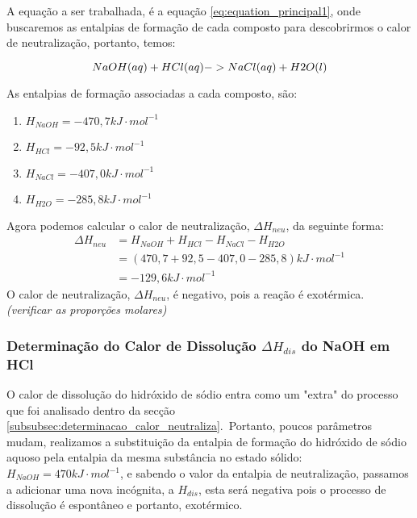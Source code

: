             \indent A equação a ser trabalhada, é a equação \ref{eq:equation_principal1}, onde buscaremos as entalpias de formação de cada composto para descobrirmos o calor de neutralização, portanto, temos:\
                        
            \begin{equation}
            	\notag
            	{NaOH(aq) + HCl(aq) -> NaCl(aq) + H2O(l)}
            \end{equation} 
        
        	\indent As entalpias de formação associadas a cada composto, são:
        	\begin{enumerate}
        		\item $H_{NaOH} = -470,7 kJ \cdot mol^{-1}$
        		\item $H_{HCl} = -92,5 kJ \cdot mol^{-1}$
                \item $H_{NaCl} = - 407,0 kJ \cdot mol^{-1}$
                \item $H_{H2O} = -285,8 kJ \cdot mol^{-1}$
        	\end{enumerate}
            \indent Agora podemos calcular o calor de neutralização, $\Delta{H_{neu}}$, da seguinte forma:
            \begin{equation}
                \begin{split}
                    \Delta{H_{neu}} &= H_{NaOH} + H_{HCl} - H_{NaCl} - H_{H2O} \\
                    &= (470,7 + 92,5 - 407,0 - 285,8 )kJ \cdot mol^{-1} \\
                    &= - 129,6 kJ \cdot mol^{-1}
                \end{split}
            \end{equation}\label{eq:equation}
            \indent O calor de neutralização, $\Delta{H_{neu}}$, é negativo, pois a reação é exotérmica.\\ 
            \indent \textit{(verificar as proporções molares)}\\
        	
        
            
            \subsubsection{Determinação do Calor de Dissolução $\Delta{H_{dis}}$ do NaOH em HCl}\label{subsubsec:determinacao_calor_dissolucao}
            \indent O calor de dissolução do hidróxido de sódio entra como um "extra" do processo que foi analisado dentro da secção \ref{subsubsec:determinacao_calor_neutraliza}.\ Portanto, poucos parâmetros mudam, realizamos a substituição da entalpia de formação do hidróxido de sódio aquoso pela entalpia da mesma substância no estado sólido: $H_{NaOH} = 470 kJ \cdot mol^{-1}$, e sabendo o valor da entalpia de neutralização, passamos a adicionar uma nova incógnita, a $H_{dis}$, esta será negativa pois o processo de dissolução é espontâneo e portanto, exotérmico.\ 
            
